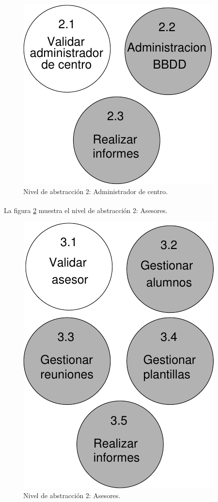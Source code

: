         \begin{figure}[!ht]
            \begin{center}
            \includegraphics[]{08.Analisis_Funcional/8.2.DFDs/Niveles/Diagramas/nivel2-2.pdf}
            \caption{Nivel de abstracción 2: Administrador de centro.}
            \label{diagramaNivel2-2}
            \end{center}
         \end{figure}

  \paragraph{}La figura \ref{diagramaNivel2-3} muestra el nivel de abstracción
  2: Asesores.

        \begin{figure}[!ht]
            \begin{center}
            \includegraphics[]{08.Analisis_Funcional/8.2.DFDs/Niveles/Diagramas/nivel2-3.pdf}
            \caption{Nivel de abstracción 2: Asesores.}
            \label{diagramaNivel2-3}
            \end{center}
         \end{figure}